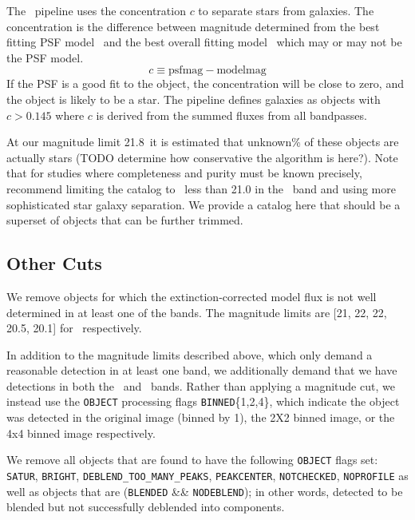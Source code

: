 \documentclass[preprint]{aastex}
\newcommand{\rmax}{21.8}
\newcommand{\contam}{unknown}
\begin{document}
The \photo\ pipeline uses the concentration $c$ to separate stars from
galaxies.  The concentration is the difference between magnitude determined
from the best fitting PSF model \psfmag\ and the best overall fitting model 
\modelmag\ which may or may not be the PSF model.
\begin{equation}
c \equiv \textrm{psfmag} - \textrm{modelmag}
\end{equation}
If the PSF is a good fit to the object, the concentration will be close to
zero, and the object is likely to be a star. The pipeline defines galaxies as
objects with $c > 0.145$ \citep{dr7classify} where $c$ is derived from the
summed fluxes from all bandpasses.  

At our magnitude limit \rmax\ it is estimated that \contam\% of these objects
are actually stars (TODO determine how conservative the algorithm is here?).
Note that for studies where completeness and purity must be known precisely,
\citet{ScrantonMag05} recommend limiting the catalog to \cmodelmag\ less than
21.0 in the \rmag\ band and using more sophisticated star galaxy separation. We
provide a catalog here that should be a superset of objects that can be further
trimmed.

\subsection{Other Cuts}

We remove objects for which the extinction-corrected model flux is not well
determined in at least one of the bands.  The magnitude limits are [21, 22, 22,
20.5, 20.1] for \allmag\ respectively.

In addition to the magnitude limits described above, which only demand a
reasonable detection in at least one band, we additionally demand that we have
detections in both the \rmag\ and \imag\ bands.  Rather than applying a
magnitude cut, we instead use the \texttt{OBJECT} processing flags
\texttt{BINNED}\{1,2,4\}, which indicate the object was detected in the original
image (binned by 1), the 2X2 binned image, or the 4x4 binned image respectively.

We remove all objects that are found to have the following \texttt{OBJECT}
flags set: \texttt{SATUR}, \texttt{BRIGHT}, \texttt{DEBLEND\_TOO\_MANY\_PEAKS},
\texttt{PEAKCENTER}, \texttt{NOTCHECKED}, \texttt{NOPROFILE} as well as objects
that are (\texttt{BLENDED} \&\& \texttt{NODEBLEND}); in other words, detected
to be blended but not successfully deblended into components. 
\end{document}
